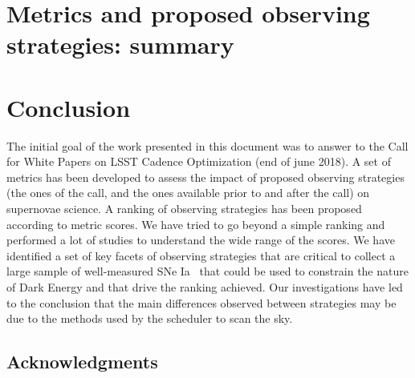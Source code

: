 \documentclass[\docopts]{\docclass}
\newcommand{\sne}{{SNe Ia }}
\begin{document}
\section{Metrics and proposed observing strategies: summary}
\label{sec:summary}



\section{Conclusion}
The initial goal of the work presented in this document was to answer to the Call for White Papers on LSST Cadence Optimization (end of june 2018). A set of metrics has been developed to assess the impact of proposed observing strategies (the ones of the call, and the ones available prior to and after the call) on supernovae science. A ranking of observing strategies has been proposed according to metric scores.
We have tried to go beyond a simple ranking and performed a lot of studies to understand the wide range of the scores. We have identified a set of key facets of observing strategies that are critical to collect a large sample of well-measured \sne~that could be used to constrain the nature of Dark Energy and that drive the ranking achieved. Our investigations have led to the conclusion that the main differences observed between strategies may be due to the methods used by the scheduler to scan the sky.  


%





\subsection*{Acknowledgments}

\end{document}
